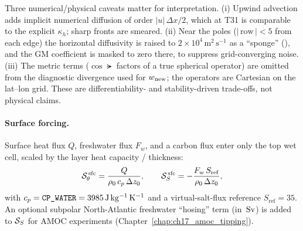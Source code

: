 \begin{remark}
Three numerical/physical caveats matter for interpretation. (i) Upwind
advection adds implicit numerical diffusion of order $|u|\,\Delta x/2$,
which at T31 is comparable to the explicit $\kappa_h$; sharp fronts are
smeared. (ii) Near the poles ($|\,\text{row}\,| < 5$ from each edge) the
horizontal diffusivity is raised to $2\times10^4\,\mathrm{m^2\,s^{-1}}$ as a
``sponge'' (), and the GM coefficient is masked to zero
there, to suppress grid-converging noise. (iii) The metric terms
($\cos\lat$ factors of a true spherical operator) are omitted from the
diagnostic divergence used for $w_{\mathrm{new}}$; the operators are
Cartesian on the lat--lon grid. These are differentiability- and
stability-driven trade-offs, not physical claims.
\end{remark}

\paragraph{Surface forcing.}
Surface heat flux $Q$, freshwater flux $F_w$, and a carbon flux enter only
the top wet cell, scaled by the layer heat capacity / thickness:
\begin{equation}
  \mathcal{S}_\theta^{\,\text{sfc}} = \frac{Q}{\rho_0\,c_p\,\Delta z_0},
  \qquad
  \mathcal{S}_S^{\,\text{sfc}} = -\frac{F_w\,S_{\mathrm{ref}}}{\rho_0\,\Delta z_0},
  \label{eq:sfcflux}
\end{equation}
with $c_p=\texttt{CP\_WATER}=3985\,\mathrm{J\,kg^{-1}\,K^{-1}}$ and a
virtual-salt-flux reference $S_{\mathrm{ref}}=35$. An optional subpolar
North-Atlantic freshwater ``hosing'' term (in $\,\mathrm{Sv}$) is added to
$\mathcal{S}_S$ for AMOC experiments (Chapter~\ref{chap:ch17_amoc_tipping}).

